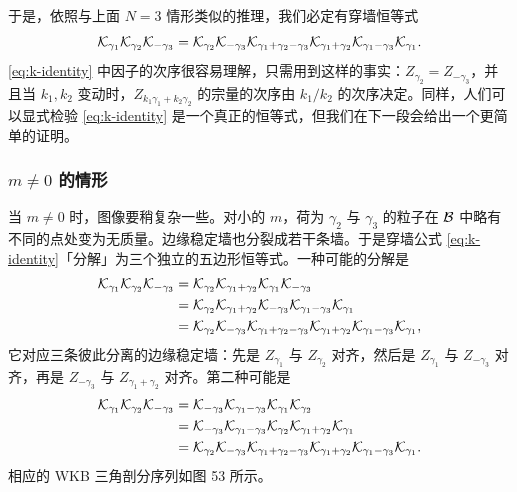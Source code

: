 于是，依照与上面 $N=3$ 情形类似的推理，我们必定有穿墙恒等式
\begin{equation} \label{eq:k-identity}
\mathcal{K}_{\gamma_1} \mathcal{K}_{\gamma_2} \mathcal{K}_{-\gamma_3}
= \mathcal{K}_{\gamma_2} \mathcal{K}_{-\gamma_3} \mathcal{K}_{\gamma_1+\gamma_2-\gamma_3} \mathcal{K}_{\gamma_1+\gamma_2}\mathcal{K}_{\gamma_1-\gamma_3}
\mathcal{K}_{\gamma_1}.
\end{equation}
\eqref{eq:k-identity} 中因子的次序很容易理解，只需用到这样的事实：$Z_{\gamma_2} = Z_{-\gamma_3}$，并且当 $k_1, k_2$ 变动时，$Z_{k_1 \gamma_1 + k_2 \gamma_2}$ 的宗量的次序由 $k_1 / k_2$ 的次序决定。同样，人们可以显式检验 \eqref{eq:k-identity} 是一个真正的恒等式，但我们在下一段会给出一个更简单的证明。

\subsubsection*{$m \neq 0$ 的情形}

当 $m \neq 0$ 时，图像要稍复杂一些。对小的 $m$，荷为 $\gamma_2$ 与 $\gamma_3$ 的粒子在 $\mathcal{B}$ 中略有不同的点处变为无质量。边缘稳定墙也分裂成若干条墙。于是穿墙公式 \eqref{eq:k-identity}「分解」为三个独立的五边形恒等式。一种可能的分解是
\begin{equation}
\begin{split}
\mathcal{K}_{\gamma_1} \mathcal{K}_{\gamma_2} \mathcal{K}_{-\gamma_3}
&= \mathcal{K}_{\gamma_2} \mathcal{K}_{\gamma_1+\gamma_2} \mathcal{K}_{\gamma_1} \mathcal{K}_{-\gamma_3} \\
&= \mathcal{K}_{\gamma_2} \mathcal{K}_{\gamma_1+\gamma_2} \mathcal{K}_{-\gamma_3} \mathcal{K}_{\gamma_1-\gamma_3} \mathcal{K}_{\gamma_1} \\
&= \mathcal{K}_{\gamma_2} \mathcal{K}_{-\gamma_3} \mathcal{K}_{\gamma_1+\gamma_2-\gamma_3} \mathcal{K}_{\gamma_1+\gamma_2}\mathcal{K}_{\gamma_1-\gamma_3}
\mathcal{K}_{\gamma_1},
\end{split}
\end{equation}
它对应三条彼此分离的边缘稳定墙：先是 $Z_{\gamma_1}$ 与 $Z_{\gamma_2}$ 对齐，然后是 $Z_{\gamma_1}$ 与 $Z_{-\gamma_3}$ 对齐，再是 $Z_{-\gamma_3}$ 与 $Z_{\gamma_1 + \gamma_2}$ 对齐。第二种可能是
\begin{equation}
\begin{split}
\mathcal{K}_{\gamma_1} \mathcal{K}_{\gamma_2} \mathcal{K}_{-\gamma_3}
&= \mathcal{K}_{-\gamma_3} \mathcal{K}_{\gamma_1-\gamma_3} \mathcal{K}_{\gamma_1} \mathcal{K}_{\gamma_2} \\
&= \mathcal{K}_{-\gamma_3} \mathcal{K}_{\gamma_1-\gamma_3} \mathcal{K}_{\gamma_2}\mathcal{K}_{\gamma_1+\gamma_2} \mathcal{K}_{\gamma_1} \\
&= \mathcal{K}_{\gamma_2} \mathcal{K}_{-\gamma_3} \mathcal{K}_{\gamma_1+\gamma_2-\gamma_3} \mathcal{K}_{\gamma_1+\gamma_2}\mathcal{K}_{\gamma_1-\gamma_3}
\mathcal{K}_{\gamma_1}.
\end{split}
\end{equation}
相应的 WKB 三角剖分序列如图 53 所示。%

